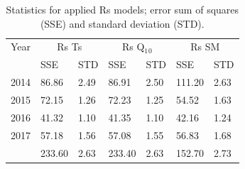 \documentclass[]{elsarticle} %
\begin{document}
\begin{table}[!h]

\caption{\label{tab:site_info-5}\label{tab:rsStats} Statistics for applied Rs models; error sum of squares (SSE) and standard deviation (STD).}
\centering
\fontsize{8}{10}\selectfont
\begin{tabular}[t]{lllllll}
\toprule
\multicolumn{1}{c}{Year} & \multicolumn{2}{c}{Rs Ts} & \multicolumn{2}{c}{Rs Q$_1$$_0$} & \multicolumn{2}{c}{Rs SM} \\
\cmidrule(l{3pt}r{3pt}){1-1} \cmidrule(l{3pt}r{3pt}){2-3} \cmidrule(l{3pt}r{3pt}){4-5} \cmidrule(l{3pt}r{3pt}){6-7}
\rowcolor{gray!6}   & SSE & STD & SSE & STD & SSE & STD\\
2014 & 86.86 & 2.49 & 86.91 & 2.50 & 111.20 & 2.63\\
\rowcolor{gray!6}  2015 & 72.15 & 1.26 & 72.23 & 1.25 & 54.52 & 1.63\\
2016 & 41.32 & 1.10 & 41.35 & 1.10 & 42.16 & 1.24\\
\rowcolor{gray!6}  2017 & 57.18 & 1.56 & 57.08 & 1.55 & 56.83 & 1.68\\
\addlinespace
2018 & 233.60 & 2.63 & 233.40 & 2.63 & 152.70 & 2.73\\
\bottomrule
\end{tabular}
\end{table}
\end{document}
